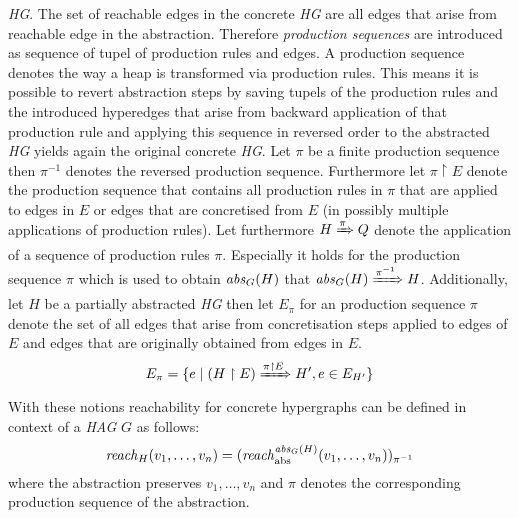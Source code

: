 	\emph{\ac{HG}}. The set of reachable edges in the concrete
	\emph{\ac{HG}} are all edges that arise from reachable edge in the
	abstraction. Therefore \emph{production sequences}
	are introduced as sequence of tupel of production rules and edges. A
	production sequence denotes the way a heap is transformed via production
	rules. This means it is possible to revert abstraction steps by saving
	tupels of the production rules and the introduced hyperedges that arise from
	backward application of that production rule and applying this sequence in
	reversed order to the abstracted \emph{\ac{HG}} yields again the original
	concrete \emph{\ac{HG}}. Let $\pi$ be a finite production
	sequence then $\pi^{-1}$ denotes the reversed production sequence.
	Furthermore let $\pi\upharpoonright E$ denote the production sequence that
	contains all production rules in $\pi$ that are applied to edges in $E$ or
	edges that are concretised from $E$ (in possibly multiple applications of
	production rules). Let furthermore $H\xRightarrow{\pi} Q$ denote
	the application of a sequence of production rules $\pi$. Especially it holds
	for the production sequence $\pi$ which is used to obtain $\mathit{abs}_{G}(H)$ that
	$\mathit{abs}_{G}(H)\xRightarrow{\pi^{-1}} H$.  Additionally, let $H$ be a partially
	abstracted \emph{\ac{HG}} then let $E_{\pi}$ for an production sequence
	$\pi$ denote the set of all edges that arise from concretisation steps
	applied to edges of $E$ and edges that are originally obtained from edges in
	$E$.
	\begin{equation*}
		E_{\pi} = \{e\mid (H\upharpoonright E)\xRightarrow
			{\pi\upharpoonright E}H', e\in E_{H'}\}
	\end{equation*}
	With these notions reachability for concrete hypergraphs can be defined
	in context of a \emph{\ac{HAG}} $G$ as follows:
	\begin{equation*}
		\mathit{reach}_H(v_{1},\dots,v_{n}) = (\mathit{reach}_{\text{abs}}^{\mathit{abs}_{G}(H)}(v_{1},
		\dots,v_{n}))_{\pi^{-1}}
	\end{equation*}
	where the abstraction preserves $v_{1}, \dots, v_{n}$ and $\pi$ denotes the
	corresponding production sequence of the abstraction.

